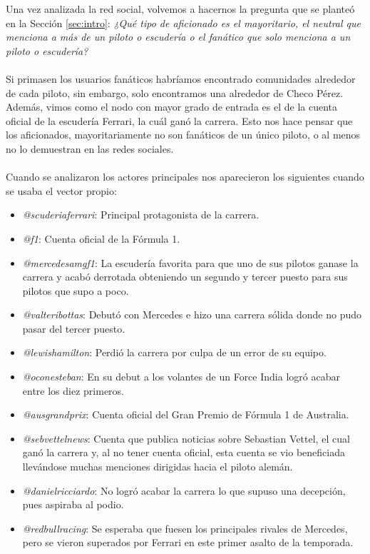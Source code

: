 Una vez analizada la red social, volvemos a hacernos la pregunta que se planteó en la Sección \ref{sec:intro}: \textit{¿Qué tipo de aficionado es el mayoritario, el neutral que menciona a más de un piloto o escudería o el fanático que solo menciona a un piloto o escudería?}
\\ \\
Si primasen los usuarios fanáticos habríamos encontrado comunidades alrededor de cada piloto, sin embargo, solo encontramos una alrededor de Checo Pérez. Además, vimos como el nodo con mayor grado de entrada es el de la cuenta oficial de la escudería Ferrari, la cuál ganó la carrera. Esto nos hace pensar que los aficionados, mayoritariamente no son fanáticos de un único piloto, o al menos no lo demuestran en las redes sociales.
\\ \\
Cuando se analizaron los actores principales nos aparecieron los siguientes cuando se usaba el vector propio:

\begin{itemize}
	\item \textit{@scuderiaferrari}: Principal protagonista de la carrera.
	\item \textit{@f1}: Cuenta oficial de la Fórmula 1.
	\item \textit{@mercedesamgf1}: La escudería favorita para que uno de sus pilotos ganase la carrera y acabó derrotada obteniendo un segundo y tercer puesto para sus pilotos que supo a poco.
	\item \textit{@valteribottas}: Debutó con Mercedes e hizo una carrera sólida donde no pudo pasar del tercer puesto.
	\item \textit{@lewishamilton}: Perdió la carrera por culpa de un error de su equipo.
	\item \textit{@oconesteban}: En su debut a los volantes de un Force India logró acabar entre los diez primeros.
	\item \textit{@ausgrandprix}: Cuenta oficial del Gran Premio de Fórmula 1 de Australia.
	\item \textit{@sebvettelnews}: Cuenta que publica noticias sobre Sebastian Vettel, el cual ganó la carrera y, al no tener cuenta oficial, esta cuenta se vio beneficiada llevándose muchas menciones dirigidas hacia el piloto alemán.
	\item \textit{@danielricciardo}: No logró acabar la carrera lo que supuso una decepción, pues aspiraba al podio.
	\item \textit{@redbullracing}: Se esperaba que fuesen los principales rivales de Mercedes, pero se vieron superados por Ferrari en este primer asalto de la temporada.
\end{itemize}

